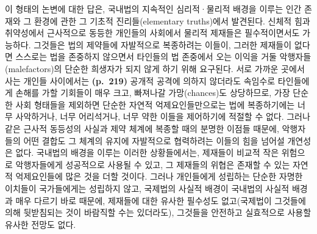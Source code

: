 이 형태의 논변에 대한 답은, 국내법의 지속적인 심리적·물리적 배경을
이루는 인간 존재와 그 환경에 관한 그 기초적 진리들(elementary
truths)에서 발견된다. 신체적 힘과 취약성에서 근사적으로 동등한 개인들의
사회에서 물리적 제재들은 필수적이면서도 가능하다. 그것들은 법의 제약들에
자발적으로 복종하려는 이들이, 그러한 제재들이 없다면 스스로는 법을
존중하지 않으면서 타인들의 법 존중에서 오는 이익을 거둘
악행자들(malefactors)의 단순한 희생자가 되지 않게 하기 위해 요구된다.
서로 가까운 곳에서 사는 개인들 사이에서는 \textbf{(p.~219)} 공개적
공격에 의하지 않더라도 속임수로 타인들에게 손해를 가할 기회들이 매우
크고, 빠져나갈 가망(chances)도 상당하므로, 가장 단순한 사회 형태들을
제외하면 단순한 자연적 억제요인들만으로는 법에 복종하기에는 너무
사악하거나, 너무 어리석거나, 너무 약한 이들을 제어하기에 적절할 수 없다.
그러나 같은 근사적 동등성의 사실과 제약 체계에 복종할 때의 분명한 이점들
때문에, 악행자들의 어떤 결합도 그 체계의 유지에 자발적으로 협력하려는
이들의 힘을 넘어설 개연성은 없다. 국내법의 배경을 이루는 이러한
상황들에서는, 제재들이 비교적 작은 위험으로 악행자들에게 성공적으로
사용될 수 있고, 그 제재들의 위협은 존재할 수 있는 자연적 억제요인들에
많은 것을 더할 것이다. 그러나 개인들에게 성립하는 단순한 자명한 이치들이
국가들에게는 성립하지 않고, 국제법의 사실적 배경이 국내법의 사실적
배경과 매우 다르기 바로 때문에, 제재들에 대한 유사한 필수성도
없고(국제법이 그것들에 의해 뒷받침되는 것이 바람직할 수는 있더라도),
그것들을 안전하고 실효적으로 사용할 유사한 전망도 없다.

